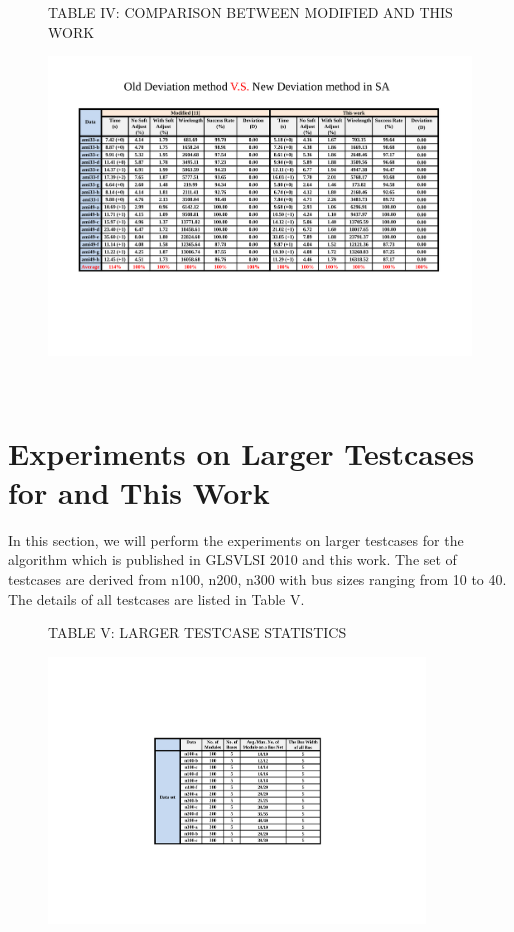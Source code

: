 \begin{figure}[htb]
{
  \centering
  \scriptsize
   TABLE IV: COMPARISON BETWEEN MODIFIED \cite{PH10} AND THIS WORK
    \centerline{\includegraphics[width=17cm]{Fig/table_4.pdf}}\\
  \label{fig::table4}
}
\end{figure}


\section{Experiments on Larger Testcases for \cite{PH10} and This Work}
\label{sec::EXPERIMENTS ON LARGER TESTCASES}

In this section, we will perform the experiments on larger testcases for the algorithm which is
published in GLSVLSI 2010 and this work.
The set of testcases are derived from n100, n200, n300 with bus sizes ranging from 10 to 40.
The details of all testcases are listed in Table V.
\begin{figure}[htb]
{
  \centering
  \scriptsize
   TABLE V: LARGER TESTCASE STATISTICS\\
   \centerline{\includegraphics[width=10cm]{Fig/table_5.pdf}}

  \label{fig::table5}
}
\end{figure}

